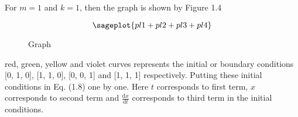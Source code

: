 For $m=1$ and $k=1$, then the graph is shown by Figure 1.4
\begin{figure}[h!]
$$\sageplot{pl1+pl2+pl3+pl4}$$
\caption{Graph}
\end{figure}

red, green, yellow and violet curves represents the initial or boundary conditions [0, 1, 0], [1, 1, 0], [0, 0, 1] and [1, 1, 1] respectively. Putting these initial conditions in Eq. (1.8) one by one. Here $t$ corresponds to first term, $x$ corresponds to second term and $\frac{\mathrm{d}x}{\mathrm{d}t}$ corresponds to third term in the initial conditions.   

